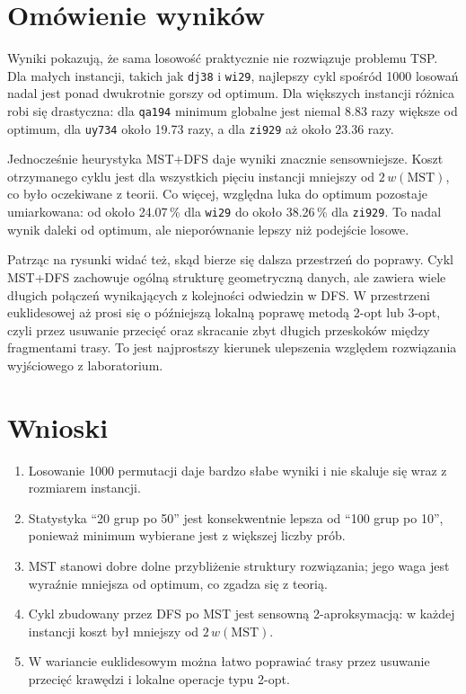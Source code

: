 \documentclass[12pt,a4paper]{article}
\begin{document}
\section{Omówienie wyników}
Wyniki pokazują, że sama losowość praktycznie nie rozwiązuje problemu TSP.
Dla małych instancji, takich jak \texttt{dj38} i \texttt{wi29}, najlepszy cykl spośród \num{1000}
losowań nadal jest ponad dwukrotnie gorszy od optimum. Dla większych instancji różnica robi się
drastyczna: dla \texttt{qa194} minimum globalne jest niemal \num{8.83} razy większe od optimum,
dla \texttt{uy734} około \num{19.73} razy, a dla \texttt{zi929} aż około \num{23.36} razy.

Jednocześnie heurystyka MST+DFS daje wyniki znacznie sensowniejsze.
Koszt otrzymanego cyklu jest dla wszystkich pięciu instancji mniejszy od \(2\,w(\mathrm{MST})\),
co było oczekiwane z teorii. Co więcej, względna luka do optimum pozostaje umiarkowana:
od około \num{24.07}\,\% dla \texttt{wi29} do około \num{38.26}\,\% dla \texttt{zi929}.
To nadal wynik daleki od optimum, ale nieporównanie lepszy niż podejście losowe.

Patrząc na rysunki widać też, skąd bierze się dalsza przestrzeń do poprawy.
Cykl MST+DFS zachowuje ogólną strukturę geometryczną danych, ale zawiera wiele długich połączeń
wynikających z kolejności odwiedzin w DFS. W przestrzeni euklidesowej aż prosi się o późniejszą
lokalną poprawę metodą 2-opt lub 3-opt, czyli przez usuwanie przecięć oraz skracanie zbyt długich
przeskoków między fragmentami trasy. To jest najprostszy kierunek ulepszenia względem rozwiązania
wyjściowego z laboratorium.

\section{Wnioski}
\begin{enumerate}
    \item Losowanie \num{1000} permutacji daje bardzo słabe wyniki i nie skaluje się wraz z rozmiarem instancji.
    \item Statystyka ``20 grup po 50'' jest konsekwentnie lepsza od ``100 grup po 10'', ponieważ minimum wybierane jest z większej liczby prób.
    \item MST stanowi dobre dolne przybliżenie struktury rozwiązania; jego waga jest wyraźnie mniejsza od optimum, co zgadza się z teorią.
    \item Cykl zbudowany przez DFS po MST jest sensowną 2-aproksymacją: w każdej instancji koszt był mniejszy od \(2\,w(\mathrm{MST})\).
    \item W wariancie euklidesowym można łatwo poprawiać trasy przez usuwanie przecięć krawędzi i lokalne operacje typu 2-opt.
\end{enumerate}
\end{document}
